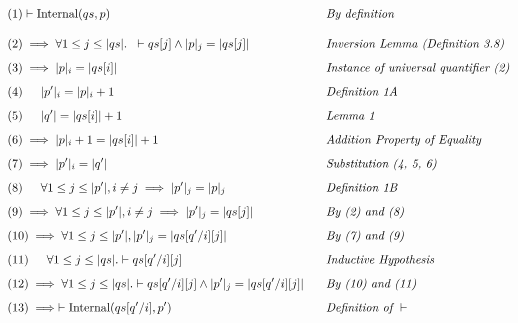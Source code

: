 \documentclass{article}
\begin{document}
\begin{alignat*}{5}
&(1) \vdash \text{Internal}(qs, p) && \hspace{0.3cm} \textit{By definition}\\[10pt]
&(2) \implies \forall 1 \leq j \leq |qs|. \hspace{0.2cm} \vdash qs[j] \land |p|_j = |qs[j]|&& \hspace{0.3cm} \textit{Inversion Lemma (Definition 3.8)}\\[5pt]
&(3) \implies |p|_i = |qs[i]|&& \hspace{0.3cm} \textit{Instance of universal quantifier (2)}\\[5pt]
&(4) \indent |p'|_i = |p|_i + 1&& \hspace{0.3cm} \textit{Definition 1A}\\[5pt]
&(5) \indent |q'| = |qs[i]| + 1&& \hspace{0.3cm} \textit{Lemma 1}\\[5pt]
&(6) \implies |p|_i + 1 = |qs[i]| + 1&& \hspace{0.3cm} \textit{Addition Property of Equality}\\[5pt]
&(7) \implies |p'|_i = |q'|&& \hspace{0.3cm} \textit{Substitution (4, 5, 6)}\\[5pt]
&(8) \indent \forall 1 \leq j \leq |p'|, i \neq j \implies |p'|_j = |p|_j&& \hspace{0.3cm} \textit{Definition 1B}\\[5pt]
&(9) \implies \forall 1 \leq j \leq |p'|, i \neq j \implies |p'|_j = |qs[j]|&& \hspace{0.3cm} \textit{By (2) and (8)}\\[5pt]
&(10) \implies \forall 1 \leq j \leq |p'|, |p'|_j = |qs[q' / i][j]|&& \hspace{0.3cm} \textit{By (7) and (9)}\\[5pt]
&(11)  \indent \forall 1 \leq j \leq |qs|. \vdash qs[q'/i][j]&& \hspace{0.3cm} \textit{Inductive Hypothesis}\\[5pt]
&(12) \implies \forall 1 \leq j \leq |qs|. \vdash qs[q'/i][j] \land |p'|_j = |qs[q'/i][j]|&&\hspace{0.3cm} \textit{By (10) and (11)}\\[5pt]
&(13) \implies \vdash \text{Internal}(qs[q'/i], p') && \hspace{0.3cm} \textit{Definition of } \vdash\\[-10pt]
\end{alignat*}
\end{document}
